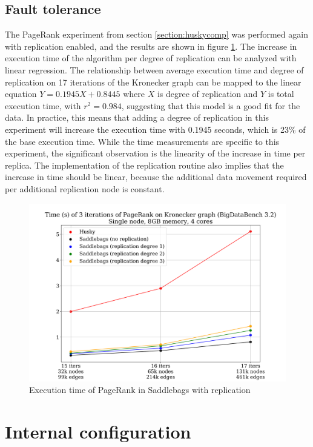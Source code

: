 \documentclass{uit-report}
\begin{document}
\subsection{Fault tolerance}\label{section:replicationeval}
The PageRank experiment from section \ref{section:huskycomp} was performed again with replication enabled, and the results are shown in figure \ref{fig:huskyfaulttolerance}.
The increase in execution time of the algorithm per degree of replication can be analyzed with linear regression. The relationship between average execution time and degree of replication on 17 iterations of the Kronecker graph can be mapped to the linear equation $Y = 0.1945X + 0.8445$ where $X$ is degree of replication and $Y$ is total execution time, with $r^2 = 0.984$, suggesting that this model is a good fit for the data. In practice, this means that adding a degree of replication in this experiment will increase the execution time with 0.1945 seconds, which is 23\% of the base execution time. While the time measurements are specific to this experiment, the significant observation is the linearity of the increase in time per replica. The implementation of the replication routine also implies that the increase in time should be linear, because the additional data movement required per additional replication node is constant.
\vskip 0.5cm
\begin{figure}[H]
	\centering
	\includegraphics[width=15cm]{illustrations/png/replication.png}
	\caption{Execution time of PageRank in Saddlebags with replication}
	\label{fig:huskyfaulttolerance}
\end{figure}

\newpage
\section{Internal configuration} \label{section:configuration}
\end{document}
